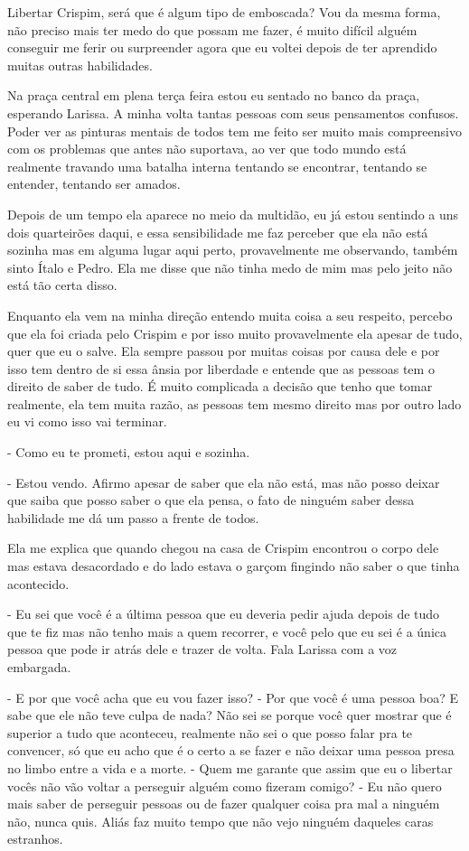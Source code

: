 Libertar Crispim, será que é algum tipo de emboscada? Vou da mesma forma, não preciso mais ter medo do que possam me fazer, é muito difícil alguém conseguir me ferir ou surpreender agora que eu voltei depois de ter aprendido muitas outras habilidades.

Na praça central em plena terça feira estou eu sentado no banco da praça, esperando Larissa. A minha volta tantas pessoas com seus pensamentos confusos. Poder ver as pinturas mentais de todos tem me feito ser muito mais compreensivo com os problemas que antes não suportava, ao ver que todo mundo está realmente travando uma batalha interna tentando se encontrar, tentando se entender, tentando ser amados.

Depois de um tempo ela aparece no meio da multidão, eu já estou sentindo a uns dois quarteirões daqui, e essa sensibilidade me faz perceber que ela não está sozinha mas em alguma lugar aqui perto, provavelmente me observando, também sinto Ítalo e Pedro. Ela me disse que não tinha medo de mim mas pelo jeito não está tão certa disso.

Enquanto ela vem na minha direção entendo muita coisa a seu respeito, percebo que ela foi criada pelo Crispim e por isso muito provavelmente ela apesar de tudo, quer que eu o salve. Ela sempre passou por muitas coisas por causa dele e por isso tem dentro de si essa ânsia por liberdade e entende que as pessoas tem o direito de saber de tudo. É muito complicada a decisão que tenho que tomar realmente, ela tem muita razão, as pessoas tem mesmo direito mas por outro lado eu vi como isso vai terminar.

- Como eu te prometi, estou aqui e sozinha.

- Estou vendo. Afirmo apesar de saber que ela não está, mas não posso deixar que saiba que posso saber o que ela pensa, o fato de ninguém saber dessa habilidade me dá um passo a frente de todos.

Ela me explica que quando chegou na casa de Crispim encontrou o corpo dele mas estava desacordado e do lado estava o garçom fingindo não saber o que tinha acontecido.

- Eu sei que você é a última pessoa que eu deveria pedir ajuda depois de tudo que te fiz mas não tenho mais a quem recorrer, e  você pelo que eu sei é a única pessoa que pode ir atrás dele e trazer de volta. Fala Larissa com a voz embargada.

- E por que você acha que eu vou fazer isso?
- Por que você é uma pessoa boa? E sabe que ele não teve culpa de nada? Não sei se porque você quer mostrar que é superior a tudo que aconteceu, realmente não sei o que posso falar pra te convencer, só que eu acho que é o certo a se fazer e não deixar uma pessoa presa no limbo entre a vida e a morte.
- Quem me garante que assim que eu o libertar vocês não vão voltar a perseguir alguém como fizeram comigo?
- Eu não quero mais saber de perseguir pessoas ou de fazer qualquer coisa pra mal a ninguém não, nunca quis. Aliás faz muito tempo que não vejo ninguém daqueles caras estranhos.

